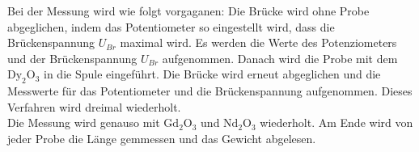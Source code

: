 Bei der Messung wird wie folgt vorgaganen: Die Brücke wird ohne Probe abgeglichen, indem das Potentiometer so eingestellt wird, dass die Brückenspannung $U_{Br}$ maximal wird. 
Es werden die Werte des Potenziometers und der Brückenspannung $U_{Br} $ aufgenommen. 
Danach wird die Probe mit dem $\text{Dy}_2\text{O}_3$ in die Spule eingeführt.
Die Brücke wird erneut abgeglichen und die Messwerte für das Potentiometer und die Brückenspannung aufgenommen. Dieses Verfahren wird dreimal wiederholt.\\

Die Messung wird genauso mit $\text{Gd}_2\text{O}_3$ und $\text{Nd}_2\text{O}_3$ wiederholt. Am Ende wird von jeder Probe die Länge gemmessen und das Gewicht abgelesen.\\
